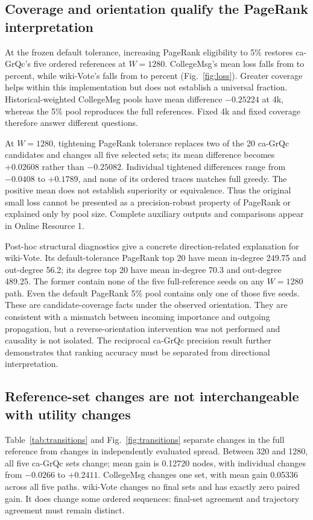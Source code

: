 \documentclass[smallextended]{svjour3}
\begin{document}
\subsection{Coverage and orientation qualify the PageRank interpretation}
At the frozen default tolerance, increasing PageRank eligibility to 5\% restores ca-GrQc's five ordered references at $W=1280$. CollegeMsg's mean loss falls from \CollegePRLoss{} to \CollegePRfiveLoss{} percent, while wiki-Vote's falls from \WikiPRLoss{} to \WikiPRfiveLoss{} percent (Fig.~\ref{fig:loss}). Greater coverage helps within this implementation but does not establish a universal fraction. Historical-weighted CollegeMsg pools have mean difference $-0.25224$ at 4k, whereas the 5\% pool reproduces the full references. Fixed 4k and fixed coverage therefore answer different questions.

At $W=1280$, tightening PageRank tolerance replaces two of the 20 ca-GrQc candidates and changes all five selected sets; its mean difference becomes $+0.02608$ rather than $-0.25082$. Individual tightened differences range from $-0.0408$ to $+0.1789$, and none of its ordered traces matches full greedy. The positive mean does not establish superiority or equivalence. Thus the original small loss cannot be presented as a precision-robust property of PageRank or explained only by pool size. Complete auxiliary outputs and comparisons appear in Online Resource 1.

Post-hoc structural diagnostics give a concrete direction-related explanation for wiki-Vote. Its default-tolerance PageRank top 20 have mean in-degree 249.75 and out-degree 56.2; its degree top 20 have mean in-degree 70.3 and out-degree 489.25. The former contain none of the five full-reference seeds on any $W=1280$ path. Even the default PageRank 5\% pool contains only one of those five seeds. These are candidate-coverage facts under the observed orientation. They are consistent with a mismatch between incoming importance and outgoing propagation, but a reverse-orientation intervention was not performed and causality is not isolated. The reciprocal ca-GrQc precision result further demonstrates that ranking accuracy must be separated from directional interpretation.

\subsection{Reference-set changes are not interchangeable with utility changes}
Table~\ref{tab:transitions} and Fig.~\ref{fig:transitions} separate changes in the full reference from changes in independently evaluated spread. Between 320 and 1280, all five ca-GrQc sets change; mean gain is 0.12720 nodes, with individual changes from $-0.0266$ to $+0.2411$. CollegeMsg changes one set, with mean gain 0.05336 across all five paths. wiki-Vote changes no final sets and has exactly zero paired gain. It does change some ordered sequences: final-set agreement and trajectory agreement must remain distinct.

\end{document}

